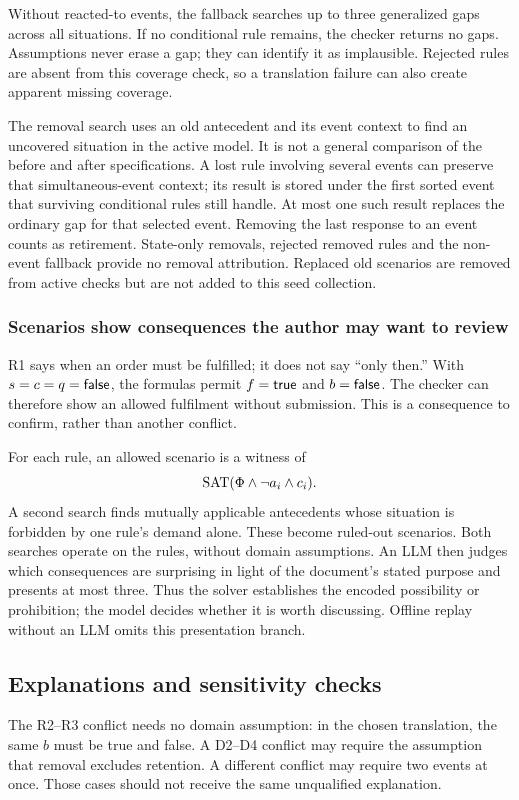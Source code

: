 Without reacted-to events, the fallback searches up to three generalized
gaps across all situations. If no conditional rule remains, the checker
returns no gaps. Assumptions never erase a gap; they can
identify it as implausible. Rejected rules are absent from this coverage
check, so a translation failure can also create apparent missing coverage.

The removal search uses an old antecedent and its event context to find
an uncovered situation in the active model. It is not a general comparison
of the before and after specifications. A lost rule involving several
events can preserve that simultaneous-event context; its result is stored
under the first sorted event that surviving conditional rules still handle.
At most one such result replaces the ordinary gap for that selected event.
Removing the last response to an event counts as retirement. State-only
removals, rejected removed rules and the non-event fallback provide no
removal attribution. Replaced old scenarios are removed from active checks
but are not added to this seed collection.

\subsubsection{Scenarios show consequences the author may want to review}
R1 says when an order must be fulfilled; it does not say ``only then.''
With $s=c=q=\mathsf{false}$, the formulas permit $f=\mathsf{true}$ and $b=\mathsf{false}$.
The checker can therefore show an allowed fulfilment without submission.
This is a consequence to confirm, rather than another conflict.

For each rule, an allowed scenario is a witness of
\[
 \operatorname{SAT}(\Phi\land\neg a_i\land c_i).
\]
A second search finds mutually applicable antecedents whose situation is
forbidden by one rule's demand alone. These become ruled-out scenarios.
Both searches operate on the rules, without domain assumptions. An LLM
then judges which consequences are surprising in light of the document's
stated purpose and presents at most three. Thus the solver establishes
the encoded possibility or prohibition; the model decides whether it is
worth discussing. Offline replay without an LLM omits this presentation
branch.

\subsection{Explanations and sensitivity checks}\label{app:explanation}
The R2--R3 conflict needs no domain assumption: in the chosen translation,
the same $b$ must be true and false. A D2--D4 conflict may require the
assumption that removal excludes retention. A different conflict may
require two events at once. Those cases should not receive the same
unqualified explanation.

